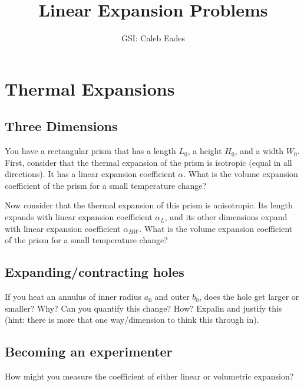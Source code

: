 \documentclass{article}
\begin{document}
	
\title{Linear Expansion Problems}
\author{GSI: Caleb Eades}
\maketitle

\section{Thermal Expansions}

\subsection{Three Dimensions}

You have a rectangular prism that has a length $L_0$, a height $H_0$, and a width $W_0$. First, consider that the thermal expansion of the prism is isotropic (equal in all directions). It has a linear expansion coefficient $\alpha$. What is the volume expansion coefficient of the prism for a small temperature change?

Now consider that the thermal expansion of this prism is anisotropic. Its length expands with linear expansion coefficient $\alpha_L$, and its other dimensions expand with linear expansion coefficient $\alpha_{HW}$. What is the volume expansion coefficient of the prism for a small temperature change?

\subsection{Expanding/contracting holes}

If you heat an annulus of inner radius $a_0$ and outer $b_0$, does the hole get larger or smaller? Why? Can you quantify this change? How? Expalin and justify this (hint: there is more that one way/dimension to think this through in).

\subsection{Becoming an experimenter}

How might you measure the coefficient of either linear or volumetric expansion?
\end{document}

